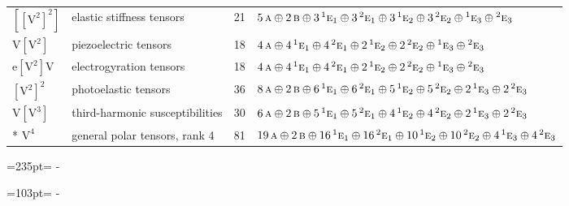 \documentclass[10pt,a4paper]{article}
\newcommand{\needspace}[1]{\par\penalty-100\begingroup\dimen0=#1\relax\dimen2=\pagegoal
  \advance\dimen2-\pagetotal\ifdim\dimen0>\dimen2\relax\ifdim\dimen2>0pt\vfil\break\fi\fi
  \endgroup}
\numberwithin{equation}{section}
\newcommand{\irr}[1]{\text{\normalfont\scshape #1}}
\newcommand{\conjpair}[1]{{}^{#1}}
\newcommand{\jahn}[1]{\mathrm{#1}}
\newlength{\fillwidth}\newlength{\cellwidth}\newlength{\colwidth}
\begin{document}
{\begin{longtable}{@{}llr>{\RaggedRight\arraybackslash}p{\fillwidth}@{}}
$\jahn{[[V^{2}]^{2}]}$ & elastic stiffness tensors & 21 & $5\,\irr{a} \oplus\allowbreak 2\,\irr{b} \oplus\allowbreak 3\,\conjpair{1}\irr{e}_{1} \oplus\allowbreak 3\,\conjpair{2}\irr{e}_{1} \oplus\allowbreak 3\,\conjpair{1}\irr{e}_{2} \oplus\allowbreak 3\,\conjpair{2}\irr{e}_{2} \oplus\allowbreak \conjpair{1}\irr{e}_{3} \oplus\allowbreak \conjpair{2}\irr{e}_{3}$\\
$\jahn{V[V^{2}]}$ & piezoelectric tensors & 18 & $4\,\irr{a} \oplus\allowbreak 4\,\conjpair{1}\irr{e}_{1} \oplus\allowbreak 4\,\conjpair{2}\irr{e}_{1} \oplus\allowbreak 2\,\conjpair{1}\irr{e}_{2} \oplus\allowbreak 2\,\conjpair{2}\irr{e}_{2} \oplus\allowbreak \conjpair{1}\irr{e}_{3} \oplus\allowbreak \conjpair{2}\irr{e}_{3}$\\
$\jahn{e[V^{2}]V}$ & electrogyration tensors & 18 & $4\,\irr{a} \oplus\allowbreak 4\,\conjpair{1}\irr{e}_{1} \oplus\allowbreak 4\,\conjpair{2}\irr{e}_{1} \oplus\allowbreak 2\,\conjpair{1}\irr{e}_{2} \oplus\allowbreak 2\,\conjpair{2}\irr{e}_{2} \oplus\allowbreak \conjpair{1}\irr{e}_{3} \oplus\allowbreak \conjpair{2}\irr{e}_{3}$\\
$\jahn{[V^{2}]^{2}}$ & photoelastic tensors & 36 & $8\,\irr{a} \oplus\allowbreak 2\,\irr{b} \oplus\allowbreak 6\,\conjpair{1}\irr{e}_{1} \oplus\allowbreak 6\,\conjpair{2}\irr{e}_{1} \oplus\allowbreak 5\,\conjpair{1}\irr{e}_{2} \oplus\allowbreak 5\,\conjpair{2}\irr{e}_{2} \oplus\allowbreak 2\,\conjpair{1}\irr{e}_{3} \oplus\allowbreak 2\,\conjpair{2}\irr{e}_{3}$\\
$\jahn{V[V^{3}]}$ & third-harmonic susceptibilities & 30 & $6\,\irr{a} \oplus\allowbreak 2\,\irr{b} \oplus\allowbreak 5\,\conjpair{1}\irr{e}_{1} \oplus\allowbreak 5\,\conjpair{2}\irr{e}_{1} \oplus\allowbreak 4\,\conjpair{1}\irr{e}_{2} \oplus\allowbreak 4\,\conjpair{2}\irr{e}_{2} \oplus\allowbreak 2\,\conjpair{1}\irr{e}_{3} \oplus\allowbreak 2\,\conjpair{2}\irr{e}_{3}$\\*
$\jahn{V^{4}}$ & general polar tensors, rank 4 & 81 & $19\,\irr{a} \oplus\allowbreak 2\,\irr{b} \oplus\allowbreak 16\,\conjpair{1}\irr{e}_{1} \oplus\allowbreak 16\,\conjpair{2}\irr{e}_{1} \oplus\allowbreak 10\,\conjpair{1}\irr{e}_{2} \oplus\allowbreak 10\,\conjpair{2}\irr{e}_{2} \oplus\allowbreak 4\,\conjpair{1}\irr{e}_{3} \oplus\allowbreak 4\,\conjpair{2}\irr{e}_{3}$\\
\bottomrule\end{longtable}}
\needspace{235pt}
\needspace{103pt}
\end{document}
